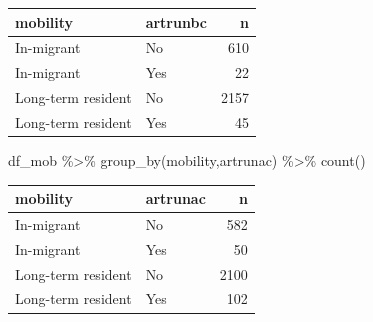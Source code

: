 \documentclass[
  letterpaper,
  DIV=11,
  numbers=noendperiod]{scrartcl}
\newenvironment{Shaded}{\begin{snugshade}}{\end{snugshade}}
\newcommand{\FunctionTok}[1]{\textcolor[rgb]{0.28,0.35,0.67}{#1}}
\newcommand{\NormalTok}[1]{\textcolor[rgb]{0.00,0.23,0.31}{#1}}
\newcommand{\SpecialCharTok}[1]{\textcolor[rgb]{0.37,0.37,0.37}{#1}}
\begin{document}
\begin{longtable}[]{@{}llr@{}}
\toprule\noalign{}
mobility & artrunbc & n \\
\midrule\noalign{}
\endhead
\bottomrule\noalign{}
\endlastfoot
In-migrant & No & 610 \\
In-migrant & Yes & 22 \\
Long-term resident & No & 2157 \\
Long-term resident & Yes & 45 \\
\end{longtable}

\begin{Shaded}
\begin{Highlighting}[]
\NormalTok{df\_mob }\SpecialCharTok{\%\textgreater{}\%} \FunctionTok{group\_by}\NormalTok{(mobility,artrunac) }\SpecialCharTok{\%\textgreater{}\%} 
  \FunctionTok{count}\NormalTok{()}
\end{Highlighting}
\end{Shaded}

\begin{longtable}[]{@{}llr@{}}
\toprule\noalign{}
mobility & artrunac & n \\
\midrule\noalign{}
\endhead
\bottomrule\noalign{}
\endlastfoot
In-migrant & No & 582 \\
In-migrant & Yes & 50 \\
Long-term resident & No & 2100 \\
Long-term resident & Yes & 102 \\
\end{longtable}
\end{document}
